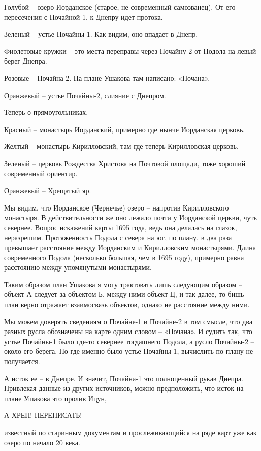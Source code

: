 Голубой – озеро Иорданское (старое, не современный самозванец). От его пересечения с Почайной-1, к Днепру идет протока.

Зеленый – устье Почайны-1. Как видим, оно впадает в Днепр. 

Фиолетовые кружки – это места переправы через Почайну-2 от Подола на левый берег Днепра.

Розовые – Почайна-2. На плане Ушакова там написано: «Почана».

Оранжевый – устье Почайны-2, слияние с Днепром.

Теперь о прямоугольниках.

Красный – монастырь Иорданский, примерно где нынче Иорданская церковь.

Желтый – монастырь Кирилловский, там где теперь Кирилловская церковь.

Зеленый – церковь Рождества Христова на Почтовой площади, тоже хороший современный ориентир.

Оранжевый – Хрещатый яр.

Мы видим, что Иорданское (Чернечье) озеро – напротив Кирилловского монастыря. В действительности же оно лежало почти у Иорданской церкви, чуть севернее. Вопрос искажений карты 1695 года, ведь она делалась на глазок, неразрешим. Протяженность Подола с севера на юг, по плану, в два раза превышает расстояние между Иорданским и Кирилловским монастырями. Длина современного Подола (несколько большая, чем в 1695 году), примерно равна расстоянию между упомянутыми монастырями.

Таким образом план Ушакова я могу трактовать лишь следующим образом – объект А следует за объектом Б, между ними объект Ц, и так далее, то бишь план верно отражает взаимосвязь объектов, однако не расстояние между ними.

Мы можем доверять сведениям о Почайне-1 и Почай\-не-2 в том смысле, что два разных русла обозначены на карте одним словом – «Почана». И судить так, что устье Почайны-1 было где-то севернее тогдашнего Подола, а русло Почайны-2 – около его берега. Но где именно было устье Почайны-1, вычислить по плану не получается.

А исток ее – в Днепре. И значит, Почайна-1 это полноценный рукав Днепра. Привлекая данные из других источников, можно предположить, что исток на плане Ушакова это пролив Ицун,

А ХРЕН! ПЕРЕПИСАТЬ!

 известный по старинным документам и прослеживающийся на ряде карт уже как озеро по начало 20 века.

